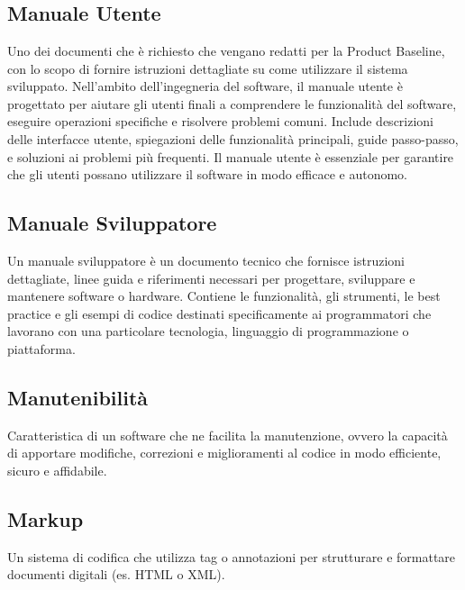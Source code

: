 
\section{}

\hypertarget{sec:manuale_utente}{}
\subsection*{Manuale Utente}
Uno dei documenti che è richiesto che vengano redatti per la Product Baseline, con lo scopo di fornire istruzioni dettagliate su 
come utilizzare il sistema sviluppato. Nell'ambito dell'ingegneria del software, il manuale utente è progettato per aiutare gli 
utenti finali a comprendere le funzionalità del software, eseguire operazioni specifiche e risolvere problemi comuni. Include 
descrizioni delle interfacce utente, spiegazioni delle funzionalità principali, guide passo-passo, e soluzioni ai problemi più 
frequenti. Il manuale utente è essenziale per garantire che gli utenti possano utilizzare il software in modo efficace e autonomo. 

\hypertarget{sec:manuale_sviluppatore}{}
\subsection*{Manuale Sviluppatore}
Un manuale sviluppatore è un documento tecnico che fornisce istruzioni dettagliate, 
linee guida e riferimenti necessari per progettare, sviluppare e mantenere software o hardware. 
Contiene le funzionalità, gli strumenti, le best practice e gli esempi di codice destinati 
specificamente ai programmatori che lavorano con una particolare tecnologia, linguaggio di programmazione o piattaforma.

\hypertarget{sec:manutenibilità}{}
\subsection*{Manutenibilità}
Caratteristica di un software che ne facilita la manutenzione, ovvero la capacità di apportare modifiche, correzioni e miglioramenti
al codice in modo efficiente, sicuro e affidabile.

\hypertarget{sec:markup}{}
\subsection*{Markup}
Un sistema di codifica che utilizza tag o annotazioni per strutturare e formattare documenti digitali (es. HTML o XML).

